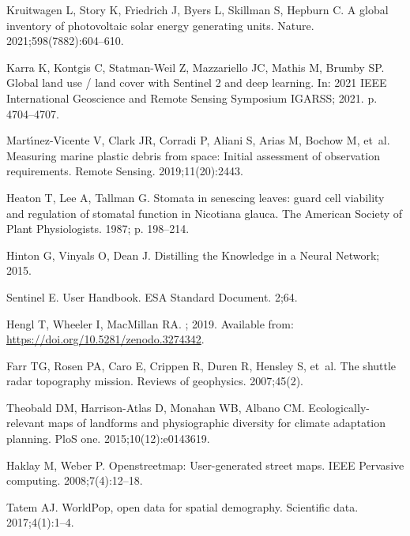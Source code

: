 \documentclass[10pt,letterpaper]{article}
\begin{document}
\begin{thebibliography}{10}
Kruitwagen L, Story K, Friedrich J, Byers L, Skillman S, Hepburn C.
\newblock A global inventory of photovoltaic solar energy generating units.
\newblock Nature. 2021;598(7882):604--610.

Karra K, Kontgis C, Statman-Weil Z, Mazzariello JC, Mathis M, Brumby SP.
\newblock Global land use / land cover with Sentinel 2 and deep learning.
\newblock In: 2021 IEEE International Geoscience and Remote Sensing Symposium
  IGARSS; 2021. p. 4704--4707.

Mart{\'\i}nez-Vicente V, Clark JR, Corradi P, Aliani S, Arias M, Bochow M,
  et~al.
\newblock Measuring marine plastic debris from space: Initial assessment of
  observation requirements.
\newblock Remote Sensing. 2019;11(20):2443.

Heaton T, Lee A, Tallman G.
\newblock Stomata in senescing leaves: guard cell viability and regulation of
  stomatal function in Nicotiana glauca.
\newblock The American Society of Plant Physiologists. 1987; p. 198–214.

Hinton G, Vinyals O, Dean J. Distilling the Knowledge in a Neural Network;
  2015.

Sentinel E.
\newblock User Handbook.
\newblock ESA Standard Document. 2;64.

Hengl T, Wheeler I, MacMillan RA.
; 2019.
\newblock Available from: \url{https://doi.org/10.5281/zenodo.3274342}.

Farr TG, Rosen PA, Caro E, Crippen R, Duren R, Hensley S, et~al.
\newblock The shuttle radar topography mission.
\newblock Reviews of geophysics. 2007;45(2).

Theobald DM, Harrison-Atlas D, Monahan WB, Albano CM.
\newblock Ecologically-relevant maps of landforms and physiographic diversity
  for climate adaptation planning.
\newblock PloS one. 2015;10(12):e0143619.

Haklay M, Weber P.
\newblock Openstreetmap: User-generated street maps.
\newblock IEEE Pervasive computing. 2008;7(4):12--18.

Tatem AJ.
\newblock WorldPop, open data for spatial demography.
\newblock Scientific data. 2017;4(1):1--4.


\end{thebibliography}
\end{document}

